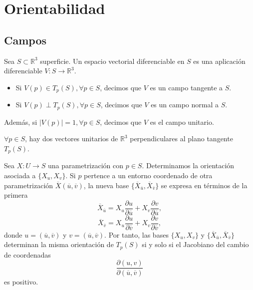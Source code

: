 \chapter{Orientabilidad}

\section{Campos}

\begin{defn}[Campo]
  Sea $S \subset \mathbb{R}^{3}$ superficie. Un espacio vectorial diferenciable en $S$ es una aplicación diferenciable $V : S \to \mathbb{R}^{3}$. 
  \begin{itemize}
    \item Si $V(p) \in T_{p}(S), \forall p \in S$, decimos que $V$ es un campo tangente a $S$.
    \item Si $V(p) \perp T_{p}(S), \forall p \in S$, decimos que $V$ es un campo normal a $S$. 
  \end{itemize}
  Además, si $| V(p) | = 1, \forall p \in S$, decimos que $V$ es el campo unitario.
\end{defn}

\begin{obs}
  $\forall p \in S$, hay dos vectores unitarios de $\mathbb{R}^{3}$ perpendiculares al plano tangente $T_{p}(S)$.
\end{obs}

\begin{note}
  Sea $X : U \to S$ una parametrización con $p \in S$. Determinamos la orientación asociada a $\{ X_{u}, X_{v} \}$. Si $p$ pertence a un entorno coordenado de otra parametrización $\overline{X}(\overline{u}, \overline{v})$, la nueva base $\{ \overline{X}_{\overline{u}}, \overline{X}_{\overline{v}} \}$ se expresa en términos de la primera
  \[ 
    \overline{X}_{\overline{u}} = X_{u} \frac{\partial{u}}{\partial{\overline{u}}} + X_{v} \frac{\partial{v}}{\partial{\overline{u}}},
  \] 
  \[ 
    \overline{X}_{\overline{v}} = X_{u} \frac{\partial{u}}{\partial{\overline{v}}} + X_{v} \frac{\partial{v}}{\partial{\overline{v}}},
  \] 
  donde $u = (\overline{u}, \overline{v})$ y $v = (\overline{u}, \overline{v})$. Por tanto, las bases $\{ X_{u}, X_{v} \}$ y $\{ \overline{X}_{\overline{u}}, \overline{X}_{\overline{v}} \}$ determinan la misma orientación de $T_{p}(S)$ si y solo si el Jacobiano del cambio de coordenadas
  \[ 
    \frac{\partial{(u, v)}}{\partial{(\overline{u}, \overline{v})}} 
  \] 
  es positivo.
\end{note}

